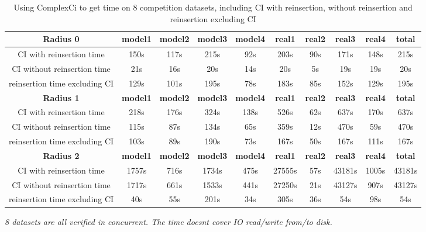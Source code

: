 \documentclass{article}
\begin{document}
	\begin{table}[!htbp]
	\begin{adjustwidth}{-2cm}{}		
		\begin{threeparttable}		
			\centering
			\caption{Using ComplexCi to get time on 8 competition datasets, including CI with reinsertion, without reinsertion and reinsertion excluding CI}
			\label{tab:table10}
			\begin{tabular}{|c|c|c|c|c|c|c|c|c|c|}
				\hline
				\textbf{Radius 0} & \textbf{model1} & \textbf{model2} & \textbf{model3} & \textbf{model4} & \textbf{real1} & \textbf{real2} & \textbf{real3} & \textbf{real4} & \textbf{total} \\ \hline
				
				CI with reinsertion time                 & 150s&117s&215s&92s&203s&90s&171s&148s&215s         \\ \hline
				CI without reinsertion time                             & 21s&16s&20s&14s&20s&5s&19s&19s&20s            \\ \hline
				reinsertion time excluding CI                         & 129s&101s&195s&78s&183s&85s&152s&129s&195s               \\ \hline
				
				\textbf{Radius 1} & \textbf{model1} & \textbf{model2} & \textbf{model3} & \textbf{model4} & \textbf{real1} & \textbf{real2} & \textbf{real3} & \textbf{real4} & \textbf{total} \\ \hline
				
				CI with reinsertion time                 & 218s&176s&324s&138s&526s&62s&637s&170s&637s         \\ \hline
				CI without reinsertion time                             & 115s&87s&134s&65s&359s&12s&470s&59s&470s            \\ \hline
				reinsertion time excluding CI                         & 103s&89s&190s&73s&167s&50s&167s&111s&167s               \\ \hline					
				
				\textbf{Radius 2} & \textbf{model1} & \textbf{model2} & \textbf{model3} & \textbf{model4} & \textbf{real1} & \textbf{real2} & \textbf{real3} & \textbf{real4} & \textbf{total} \\ \hline
				CI with reinsertion time                 & 1757s&716s&1734s&475s&27555s&57s&43181s&1005s&43181s         \\ \hline
				CI without reinsertion time                             & 1717s&661s&1533s&441s&27250s&21s&43127s&907s&43127s         \\ \hline
				reinsertion time excluding CI                         & 40s&55s&201s&34s&305s&36s&54s&98s&54s                \\ \hline				
			\end{tabular}
			\begin{tablenotes}
				\small
				\item\textit{ 8 datasets are all verified in concurrent. The time doesn\textquotesingle t cover IO read/write from/to disk.}
			\end{tablenotes}			
		\end{threeparttable}
	\end{adjustwidth}	
	\end{table}	
\end{document}

